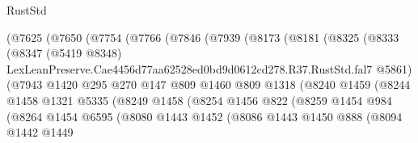 \begin{lexlean}{RustStd}
\begin{coremodule}
                    (@7625
                      (@7650
                        (@7754
                          (@7766
                            (@7846
                              (@7939
                                (@8173
                                  (@8181
                                    (@8325
                                      (@8333
                                        (@8347
                                          (@5419 @8348)
                                          LexLeanPreserve.Cae4456d77aa62528ed0bd9d0612cd278.R37.RustStd.fal7
                                          @5861)
                                        (@7943
                                          @1420
                                          @295
                                          @270
                                          @147
                                          @809
                                          @1460
                                          @809
                                          @1318
                                          (@8240
                                            @1459
                                            (@8244
                                              @1458
                                              @1321
                                              @5335
                                              (@8249
                                                @1458
                                                (@8254
                                                  @1456
                                                  @822
                                                  (@8259
                                                    @1454
                                                    @984
                                                    (@8264
                                                      @1454
                                                      @6595
                                                      (@8080
                                                        @1443
                                                        @1452
                                                        (@8086
                                                          @1443
                                                          @1450
                                                          @888
                                                          (@8094
                                                            @1442
                                                            @1449

\end{coremodule}
\end{lexlean}

